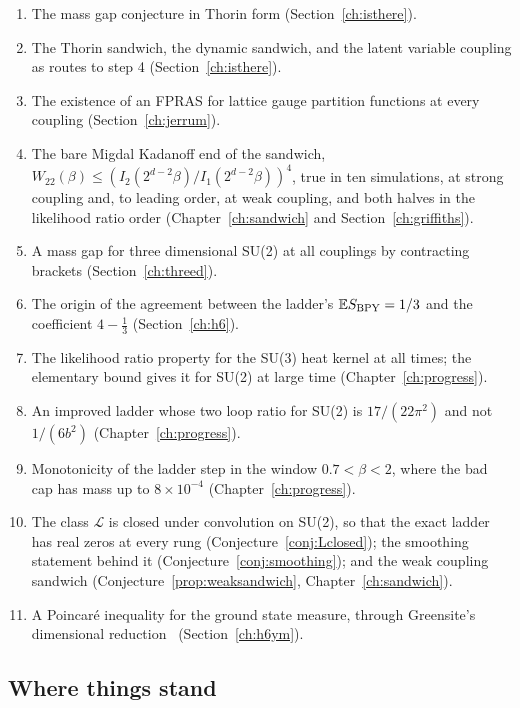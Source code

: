 \begin{enumerate}
\item The mass gap conjecture in Thorin form (Section~\ref{ch:isthere}).
\item The Thorin sandwich, the dynamic sandwich, and the latent variable coupling as routes to step 4 (Section~\ref{ch:isthere}).
\item The existence of an FPRAS for lattice gauge partition functions at every coupling (Section~\ref{ch:jerrum}).
\item The bare Migdal Kadanoff end of the sandwich, $W_{22}(\beta)\le(I_2(2^{d-2}\beta)/I_1(2^{d-2}\beta))^4$, true in ten simulations, at strong coupling and, to leading order, at weak coupling, and both halves in the likelihood ratio order (Chapter~\ref{ch:sandwich} and Section~\ref{ch:griffiths}).
\item A mass gap for three dimensional SU(2) at all couplings by contracting brackets (Section~\ref{ch:threed}).
\item The origin of the agreement between the ladder's $\mathbb{E} S_{\mathrm{BPY}}=1/3$ and the coefficient $4-\frac13$ (Section~\ref{ch:h6}).
\item The likelihood ratio property for the SU(3) heat kernel at all times; the elementary bound gives it for SU(2) at large time (Chapter~\ref{ch:progress}).
\item An improved ladder whose two loop ratio for SU(2) is $17/(22\pi^2)$ and not $1/(6b^2)$ (Chapter~\ref{ch:progress}).
\item Monotonicity of the ladder step in the window $0.7<\beta<2$, where the bad cap has mass up to $8\times10^{-4}$ (Chapter~\ref{ch:progress}).
\item The class $\mathcal L$ is closed under convolution on SU(2), so that the exact ladder has real zeros at every rung (Conjecture~\ref{conj:Lclosed}); the smoothing statement behind it (Conjecture~\ref{conj:smoothing}); and the weak coupling sandwich (Conjecture~\ref{prop:weaksandwich}, Chapter~\ref{ch:sandwich}).
\item A Poincar\'e inequality for the ground state measure, through Greensite's dimensional reduction~\cite{Gr79} (Section~\ref{ch:h6ym}).
\end{enumerate}

\subsection{Where things stand}

